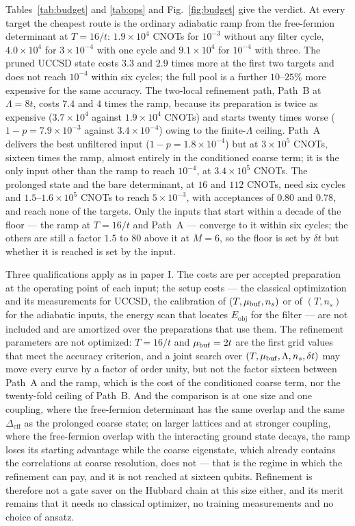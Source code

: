 \documentclass[
  aps,
  prc,
  reprint,
  superscriptaddress,
  floatfix,
  nofootinbib
]{revtex4-2}
\newcommand{\Eobj}{E_{\mathrm{obj}}}
\newcommand{\Deff}{\Delta_{\mathrm{eff}}}
\begin{document}
Tables~\ref{tab:budget} and \ref{tab:ops} and Fig.~\ref{fig:budget} give
the verdict.  At every target the cheapest route is the ordinary adiabatic
ramp from the free-fermion determinant at $T=16/t$: $1.9\times10^4$ CNOTs
for $10^{-3}$ without any filter cycle, $4.0\times10^4$ for
$3\times10^{-4}$ with one cycle and $9.1\times10^4$ for $10^{-4}$ with
three.  The pruned UCCSD state costs $3.3$ and $2.9$ times more at the
first two targets and does not reach $10^{-4}$ within six cycles; the
full pool is a further $10$--$25\%$ more expensive for the same accuracy.
The two-local refinement path, Path~B at $\Lambda=8t$, costs $7.4$ and $4$
times the ramp, because its preparation is twice as expensive
($3.7\times10^4$ against $1.9\times10^4$ CNOTs) and starts twenty times
worse ($1-p=7.9\times10^{-3}$ against $3.4\times10^{-4}$) owing to the
finite-$\Lambda$ ceiling.  Path~A delivers the best unfiltered input
($1-p=1.8\times10^{-4}$) but at $3\times10^5$ CNOTs, sixteen times the
ramp, almost entirely in the conditioned coarse term; it is the only input
other than the ramp to reach $10^{-4}$, at $3.4\times10^5$ CNOTs.  The
prolonged state and the bare determinant, at $16$ and $112$ CNOTs, need
six cycles and $1.5$--$1.6\times10^5$ CNOTs to reach $5\times10^{-3}$, with
acceptances of $0.80$ and $0.78$, and reach none of the targets.  Only the
inputs that start within a decade of the floor --- the ramp at $T=16/t$ and
Path~A --- converge to it within six cycles; the others are still a factor
$1.5$ to $80$ above it at $M=6$, so the floor is set by $\delta t$ but
whether it is reached is set by the input.

Three qualifications apply as in paper I.  The costs are per accepted
preparation at the operating point of each input; the setup costs
--- the classical optimization and its measurements for UCCSD, the
calibration of $(T,\mu_{\rm buf},n_s)$ or of $(T,n_s)$ for the adiabatic
inputs, the energy scan that locates $\Eobj$ for the filter --- are not
included and are amortized over the preparations that use them.  The
refinement parameters are not optimized: $T=16/t$ and $\mu_{\rm buf}=2t$
are the first grid values that meet the accuracy criterion, and a joint
search over $(T,\mu_{\rm buf},\Lambda,n_s,\delta t)$ may move every curve
by a factor of order unity, but not the factor sixteen between Path~A and
the ramp, which is the cost of the conditioned coarse term, nor the
twenty-fold ceiling of Path~B.  And the comparison is at one size and one
coupling, where the free-fermion determinant has the same overlap and the
same $\Deff$ as the prolonged coarse state; on larger lattices and at
stronger coupling, where the free-fermion overlap with the interacting
ground state decays, the ramp loses its starting advantage while the
coarse eigenstate, which already contains the correlations at coarse
resolution, does not --- that is the regime in which the refinement can
pay, and it is not reached at sixteen qubits.  Refinement is therefore not
a gate saver on the Hubbard chain at this size either, and its merit
remains that it needs no classical optimizer, no training measurements
and no choice of ansatz.
\end{document}
